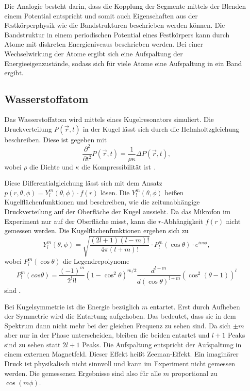 Die Analogie besteht darin, dass die Kopplung der Segmente mittels der Blenden einem Potential entspricht und somit auch Eigenschaften aus der Festkörperphysik wie die Bandstrukturen beschrieben werden können. 
Die Bandstruktur in einem periodischen Potential eines Festkörpers kann durch Atome mit diskreten Energieniveaus beschrieben werden. Bei einer Wechselwirkung der Atome ergibt sich eine Aufspaltung der Energieeigenzustände, sodass sich für viele Atome eine Aufspaltung in ein Band ergibt. \cite{QM2}


\subsection{Wasserstoffatom}
\label{sec:Wasserstoff}
Das Wasserstoffatom wird mittels eines Kugelresonators simuliert. Die Druckverteilung $P(\vec r,t)$ in der Kugel lässt sich durch die Helmholtzgleichung beschreiben. 
Diese ist gegeben mit 
\begin{equation*}
    \frac{\partial^2}{\partial t^2} P(\vec r,t) = \frac{1}{\rho\kappa} \Delta P(\vec r,t),
\end{equation*}
wobei $\rho$ die Dichte und $\kappa$ die Kompressibilität ist \cite{QM1}. 

Diese Differentialgleichung lässt sich mit dem Ansatz $p(r, \theta, \phi) = Y^m_l(\theta, \phi) \cdot f(r)$ lösen.
Die $Y^m_l(\theta, \phi)$ heißen Kugelflächenfunktionen und beschreiben, wie die zeitunabhängige Druckverteilung auf der Oberfläche der Kugel aussieht. 
Da das Mikrofon im Experiment nur auf der Oberfläche misst, kann die $r$-Abhängigkeit $f(r)$ nicht gemessen werden. 
Die Kugelflächenfunktionen ergeben sich zu 
\begin{equation*}
    Y^m_l (\theta, \phi) = \sqrt{\frac{(2l+1)(l-m)!}{4\pi(l+m)!}} \cdot P^m_l(\cos \theta) \cdot e^{i m \phi},
\end{equation*}
wobei $P^m_l(\cos \theta)$ die Legendrepolynome 
\begin{equation*}
P^m_l(cos \theta) = \frac{(-1)^m}{2^l l!} (1- \cos^2 \theta)^{m/2} \frac{d^{l+m}}{d(\cos \theta)^{l+m}} (\cos^2 (\theta -1))^l
\end{equation*}
sind \cite{QM1}.

Bei Kugelsymmetrie ist die Energie bezüglich $m$ entartet. 
Erst durch Aufheben der Symmetrie wird die Entartung aufgehoben.  
Das bedeutet, dass sie in dem Spektrum dann nicht mehr bei der gleichen Frequenz zu sehen sind. Da sich $\pm m$ aber nur in der Phase unterscheiden, bleiben die beiden entartet und $l+1$ Peaks sind zu sehen statt $2l+1$ Peaks.
Die Aufspaltung entspricht der Aufspaltung in einem externen Magnetfeld. Dieser Effekt heißt Zeeman-Effekt.
Ein imaginärer Druck ist physikalisch nicht sinnvoll und kann im Experiment nicht gemessen werden. Die gemessenen Ergebnisse sind also für alle $m$ proportional zu $\cos(m\phi)$. 


